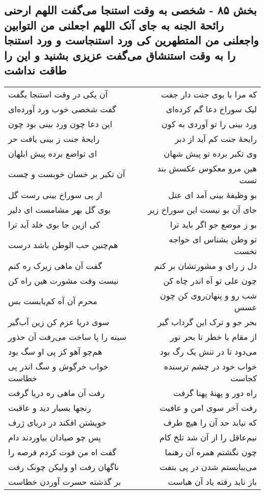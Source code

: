\begin{center}
\section*{بخش ۸۵ - شخصی به وقت استنجا می‌گفت اللهم ارحنی رائحة الجنه به جای آنک اللهم اجعلنی من التوابین واجعلنی من  المتطهرین کی ورد استنجاست و ورد استنجا را به وقت استنشاق می‌گفت عزیزی بشنید و این را طاقت نداشت}
\label{sec:sh085}
\begin{longtable}{l p{0.5cm} r}
آن یکی در وقت استنجا بگفت
&&
که مرا با بوی جنت دار جفت
\\
گفت شخصی خوب ورد آورده‌ای
&&
لیک سوراخ دعا گم کرده‌ای
\\
این دعا چون ورد بینی بود چون
&&
ورد بینی را تو آوردی به کون
\\
رایحهٔ جنت ز بینی یافت حر
&&
رایحهٔ جنت کم آید از دبر
\\
ای تواضع برده پیش ابلهان
&&
وی تکبر برده تو پیش شهان
\\
آن تکبر بر خسان خوبست و چست
&&
هین مرو معکوس عکسش بند تست
\\
از پی سوراخ بینی رست گل
&&
بو وظیفهٔ بینی آمد ای عتل
\\
بوی گل بهر مشامست ای دلیر
&&
جای آن بو نیست این سوراخ زیر
\\
کی ازین جا بوی خلد آید ترا
&&
بو ز موضع جو اگر باید ترا
\\
هم‌چنین حب الوطن باشد درست
&&
تو وطن بشناس ای خواجه نخست
\\
گفت آن ماهی زیرک ره کنم
&&
دل ز رای و مشورتشان بر کنم
\\
نیست وقت مشورت هین راه کن
&&
چون علی تو آه اندر چاه کن
\\
محرم آن آه کم‌یابست بس
&&
شب رو و پنهان‌روی کن چون عسس
\\
سوی دریا عزم کن زین آب‌گیر
&&
بحر جو و ترک این گرداب گیر
\\
سینه را پا ساخت می‌رفت آن حذور
&&
از مقام با خطر تا بحر نور
\\
هم‌چو آهو کز پی او سگ بود
&&
می‌دود تا در تنش یک رگ بود
\\
خواب خرگوش و سگ اندر پی خطاست
&&
خواب خود در چشم ترسنده کجاست
\\
رفت آن ماهی ره دریا گرفت
&&
راه دور و پهنهٔ پهنا گرفت
\\
رنجها بسیار دید و عاقبت
&&
رفت آخر سوی امن و عافیت
\\
خویشتن افکند در دریای ژرف
&&
که نیابد حد آن را هیچ طرف
\\
پس چو صیادان بیاوردند دام
&&
نیم‌عاقل را از آن شد تلخ کام
\\
گفت اه من فوت کردم فرصه را
&&
چون نگشتم همره آن رهنما
\\
ناگهان رفت او ولیکن چونک رفت
&&
می‌ببایستم شدن در پی بتفت
\\
بر گذشته حسرت آوردن خطاست
&&
باز ناید رفته یاد آن هباست
\\
\end{longtable}
\end{center}
